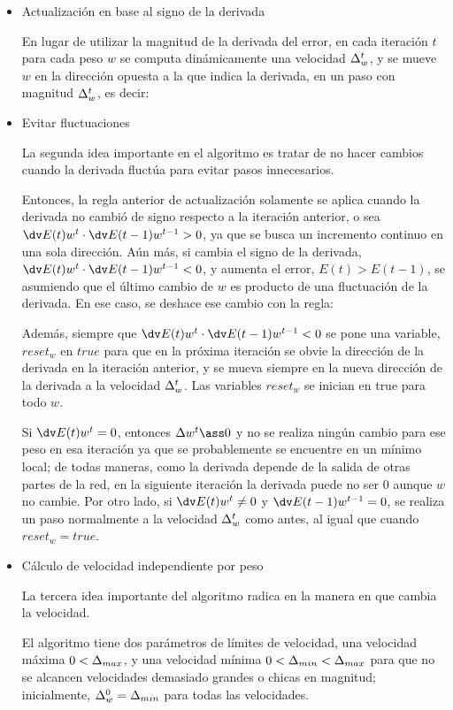\begin{itemize}
\item Actualización en base al signo de la derivada 

En lugar de utilizar la magnitud de la derivada del error, en cada iteración $t$ para cada peso $w$ se computa dinámicamente una velocidad $\Delta^{t}_w$, y se mueve $w$ en la dirección opuesta a la que indica la derivada, en un paso con magnitud $\Delta^{t}_w$, es decir: 


\item Evitar fluctuaciones 

La segunda idea importante en el algoritmo es tratar de no hacer cambios cuando la derivada fluctúa para evitar pasos innecesarios. 

Entonces, la regla anterior de actualización solamente se aplica cuando la derivada no cambió de signo respecto a la iteración anterior, o sea $\multidv >0$, ya que se busca un incremento continuo en una sola dirección. Aún más, si cambia el signo de la derivada, $\multidv <0$, y aumenta el error, $E(t)>E(t-1)$, se asumiendo que el último cambio de $w$ es producto de una fluctuación de la derivada. En ese caso, se deshace ese cambio con la regla:

\ma{
\wtp& \ass \wt - \dwtm
}

Además, siempre que $\multidv <0$ se pone una variable, $reset_w$ en $true$ para que en la próxima iteración se obvie la dirección de la derivada en la iteración anterior, y se mueva siempre en la nueva dirección de la derivada a la velocidad $\Delta^{t}_w$. Las variables $reset_w$ se inician en true para todo $w$.

Si $\dvt =0$, entonces $\dwt \ass 0$ y no se realiza ningún cambio para ese peso en esa iteración ya que se probablemente se encuentre en un mínimo local; de todas maneras, como la derivada depende de la salida de otras partes de la red, en la siguiente iteración la derivada puede no ser $0$ aunque $w$ no cambie. Por otro lado, si $\dvt \neq 0$ y $\dvtm =0$, se realiza un paso normalmente a la velocidad $\Delta^{t}_w$ como antes, al igual que cuando $reset_w=true$. 

\item Cálculo de velocidad independiente por peso

La tercera idea importante del algoritmo radica en la manera en que cambia la velocidad.
 
El algoritmo tiene dos parámetros de límites de velocidad, una velocidad máxima $0<\Delta_{max}$, y una velocidad mínima $0<\Delta_{min}<\Delta_{max}$ para que no se alcancen velocidades demasiado grandes o chicas en magnitud; inicialmente, $\Delta_w^0=\Delta_{min}$ para todas las velocidades. 


\end{itemize}
